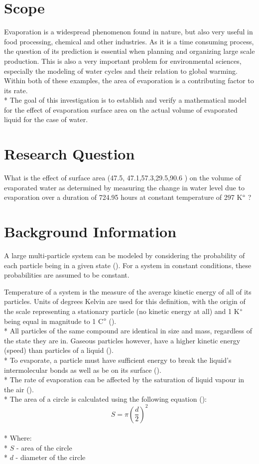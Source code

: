 \documentclass[12pt,letterpaper,final]{report}
\begin{document}
\section{Scope}
Evaporation is a widespread phenomenon found in nature, but also very useful in food processing, chemical and other industries. As it is a time consuming process, the question of its prediction is essential when planning and organizing large scale production. This is also a very important problem for environmental sciences, especially the modeling of water cycles and their relation to global warming. Within both of these examples, the area of evaporation is a contributing factor to its rate.
\medskip
\\* The goal of this investigation is to establish and verify a mathematical model for the effect of evaporation surface area on the actual volume of evaporated liquid for the case of water.
\section{Research Question}
What is the effect of surface area (47.5, 47.1,57.3,29.5,90.6 ) on the volume of evaporated water as determined by measuring the change in water level due to evaporation over a duration of 724.95 hours at constant temperature of 297 K$\degree$ ?

\section{Background Information}
A large multi-particle system can be modeled by considering the probability of each particle being in a given state (\cite{stats}). For a system in constant conditions, these probabilities are assumed to be constant.

\medskip
\noindent Temperature of a system is the measure of the average kinetic energy of all of its particles. Units of degrees Kelvin are used for this definition, with the origin of the scale representing a stationary particle (no kinetic energy at all) and 1 K$\degree$ being equal in magnitude to 1 C$\degree$ (\cite{kelvin}).
\medskip
\\* All particles of the same compound are identical in size and mass, regardless of the state they are in. Gaseous particles however, have a higher kinetic energy (speed) than particles of a liquid (\cite{phase}). 
\medskip
\\* To evaporate, a particle must have sufficient energy to break the liquid's intermolecular bonds as well as be on its surface (\cite{evap}). 
\medskip
\\* The rate of evaporation can be affected by the saturation of liquid vapour in the air (\cite{evap}).
\medskip
\\* The area of a circle is calculated using the following equation (\cite{circle}):
\begin{equation} \label{eq:circa}
S = \pi \left(\frac{d}{2}\right)^{2}
\end{equation}
\medskip
\\* Where:
\medskip
\\* $S$ - area of the circle
\\* $d$ - diameter of the circle
\end{document}
